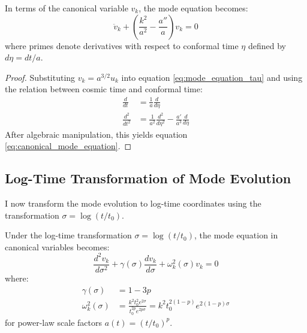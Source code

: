 \begin{theorem}
\label{thm:simplified_mode_equation}
In terms of the canonical variable $v_k$, the mode equation becomes:
\begin{equation}
\ddot{v}_k + \left( \frac{k^2}{a^2} - \frac{a''}{a} \right) v_k = 0
\label{eq:canonical_mode_equation}
\end{equation}
where primes denote derivatives with respect to conformal time $\eta$ defined by $d\eta = dt/a$.
\end{theorem}

\begin{proof}
Substituting $v_k = a^{3/2} u_k$ into equation \eqref{eq:mode_equation_tau} and using the relation between cosmic time and conformal time:
\begin{align}
\frac{d}{dt} &= \frac{1}{a} \frac{d}{d\eta} \\
\frac{d^2}{dt^2} &= \frac{1}{a^2} \frac{d^2}{d\eta^2} - \frac{a'}{a^3} \frac{d}{d\eta}
\end{align}
After algebraic manipulation, this yields equation \eqref{eq:canonical_mode_equation}.
\end{proof}

\subsection{Log-Time Transformation of Mode Evolution}
\label{subsec:log_time_mode_evolution}

I now transform the mode evolution to log-time coordinates using the transformation $\sigma = \log(t/t_0)$.

\begin{theorem}
\label{thm:log_time_mode_equation}
Under the log-time transformation $\sigma = \log(t/t_0)$, the mode equation in canonical variables becomes:
\begin{equation}
\frac{d^2v_k}{d\sigma^2} + \gamma(\sigma) \frac{dv_k}{d\sigma} + \omega_k^2(\sigma) v_k = 0
\label{eq:log_time_mode_equation}
\end{equation}
where:
\begin{align}
\gamma(\sigma) &= 1 - 3p \\
\omega_k^2(\sigma) &= \frac{k^2 t_0^2 e^{2\sigma}}{t_0^{2p} e^{2p\sigma}} = k^2 t_0^{2(1-p)} e^{2(1-p)\sigma}
\end{align}
for power-law scale factors $a(t) = (t/t_0)^p$.
\end{theorem}

